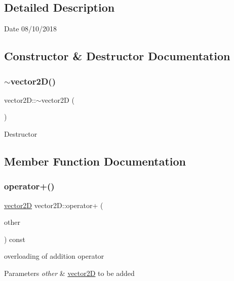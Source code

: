 \subsection{Detailed Description}
\begin{DoxyDate}{Date}
08/10/2018 
\end{DoxyDate}


\subsection{Constructor \& Destructor Documentation}
\mbox{\label{classvector2_d_af73bed617f7a6e1ffb9bd6aef4716b7c}} 
\subsubsection{\texorpdfstring{$\sim$vector2\+D()}{~vector2D()}}
{\footnotesize\ttfamily vector2\+D\+::$\sim$vector2D (\begin{DoxyParamCaption}{ }\end{DoxyParamCaption})}

Destructor 

\subsection{Member Function Documentation}
\mbox{\label{classvector2_d_a33d6cfdf94ab15b76f5ac0ad05c4109b}} 
\subsubsection{\texorpdfstring{operator+()}{operator+()}}
{\footnotesize\ttfamily \mbox{\hyperlink{classvector2_d}{vector2D}} vector2\+D\+::operator+ (\begin{DoxyParamCaption}\item[{const \mbox{\hyperlink{classvector2_d}{vector2D}} \&}]{other }\end{DoxyParamCaption}) const}



overloading of addition operator 


\begin{DoxyParams}{Parameters}
{\em other} & \mbox{\hyperlink{classvector2_d}{vector2D}} to be added \\
\hline
\end{DoxyParams}
\mbox{\label{classvector2_d_a4ce04081cc5ad5cad63696b6eed97bdc}} 
